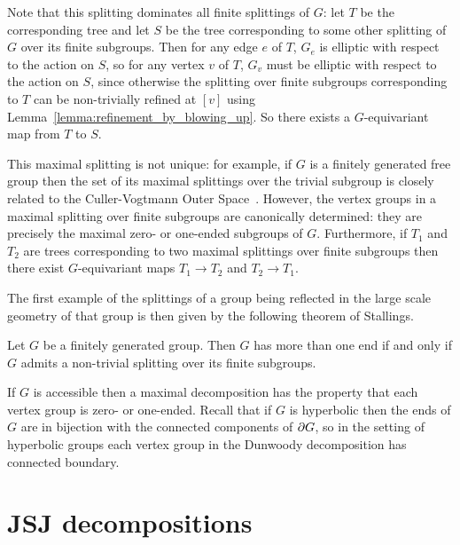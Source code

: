 \begin{remark}
  Note that this splitting dominates all finite splittings of $G$: let $T$ be the corresponding tree and let $S$ be the tree corresponding to some other splitting of $G$ over its finite subgroups.
  Then for any edge $e$ of $T$, $G_e$ is elliptic with respect to the action on $S$, so for any vertex $v$ of $T$, $G_v$ must be elliptic with respect to the action on $S$, since otherwise the splitting over finite subgroups corresponding to $T$ can be non-trivially refined at $[v]$ using Lemma~\ref{lemma:refinement_by_blowing_up}.
  So there exists a $G$-equivariant map from $T$ to $S$. 
  \label{rem:maximalfinitesplitting}
\end{remark}

\begin{remark}\label{rem:nonuniqueness}
  This maximal splitting is not unique: for example, if $G$ is a finitely generated free group then the set of its maximal splittings over the trivial subgroup is closely related to the Culler-Vogtmann Outer Space~\cite{cullervogtmann86}.
  However, the vertex groups in a maximal splitting over finite subgroups are canonically determined: they are precisely the maximal zero-{} or one-ended subgroups of $G$.
  Furthermore, if $T_1$ and $T_2$ are trees corresponding to two maximal splittings over finite subgroups then there exist $G$-equivariant maps $T_1 \to T_2$ and $T_2 \to T_1$.
\end{remark}

The first example of the splittings of a group being reflected in the large scale geometry of that group is then given by the following theorem of Stallings.

\begin{theorem}\cite{stallings68,stallings71}
  \label{theorem:stallings}
  Let $G$ be a finitely generated group. 
  Then $G$ has more than one end if and only if $G$ admits a non-trivial splitting over its finite subgroups.
\end{theorem}

If $G$ is accessible then a maximal decomposition has the property that each vertex group is zero-{} or one-ended.
Recall that if $G$ is hyperbolic then the ends of $G$ are in bijection with the connected components of $\partial G$, so in the setting of hyperbolic groups each vertex group in the Dunwoody decomposition has connected boundary.

\section{JSJ decompositions}

